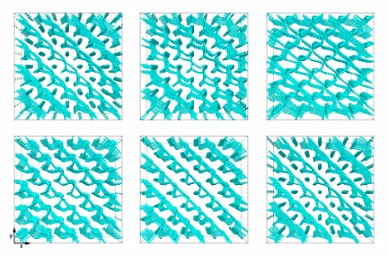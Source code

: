 \documentclass[aps,pre,reprint,superscriptaddress, twocolumn]{revtex4}
\begin{document}
\begin{figure}[htpb]
\includegraphics[width=0.32\textwidth]{disc-365k_run914.png}
\includegraphics[width=0.32\textwidth]{disc-367k_run914.png}
\includegraphics[width=0.32\textwidth]{disc-375k_run914.png}\\
\includegraphics[width=0.32\textwidth]{disc-380k_run914.png}
\includegraphics[width=0.32\textwidth]{disc-384k_run914.png}
\includegraphics[width=0.32\textwidth]{disc-389k_run914.png}

\end{figure}
\end{document}
